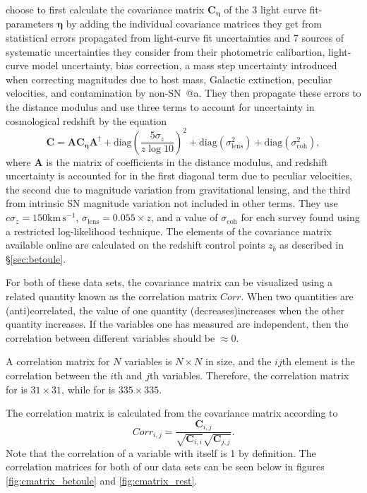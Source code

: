 \documentclass[12pt,a4paper]{article}
\makeatletter
\newcommand*{\rom}[1]{\expandafter\@slowromancap\romannumeral #1@}
\newcommand{\sn}{\mbox{SN}}
\newcommand{\sna}{\mbox{SN \rom{1}a}}
\makeatother
\begin{document}
\citet{betoule2014} choose to first calculate the covariance 
matrix $\mathbf{C}_{\mathbf{\eta}}$ of the 3 light curve fit-parameters $\mathbf{\eta}$ 
by adding the individual covariance matrices they get from statistical errors propagated 
from light-curve fit uncertainties and 7 sources of systematic uncertainties 
they consider from their photometric calibartion, light-curve model uncertainty, 
bias correction, a mass step uncertainty introduced when correcting magnitudes due 
to host mass, Galactic extinction, peculiar velocities, and contamination by 
non-\sna{}. They then propagate these errors to the distance modulus and use three 
terms to account for uncertainty in cosmological redshift by the equation
\begin{equation}
\label{eq:BetouleCovMatrix}
\mathbf{C} = \mathbf{A} \mathbf{C}_\mathbf{\eta} \mathbf{A}^\dag + \mathrm{diag}\left(\frac{5 \sigma_z}{z \log 10}\right)^2 + \mathrm{diag}\left(\sigma_{\mathrm{lens}}^2\right) + \mathrm{diag}\left(\sigma_{\mathrm{coh}}^2\right),
\end{equation}
where $\mathbf{A}$ is the matrix of coefficients in the distance modulus, 
and redshift uncertainty is accounted for in the first diagonal term due to 
peculiar velocities, the second due to magnitude variation from gravitational lensing, 
and the third from intrinsic \sn{} magnitude variation not included in other terms. 
They use $c \sigma_z = 150 \mathrm{km}\, \mathrm{s}^{-1}$, 
$\sigma_{\mathrm{lens}} = 0.055 \times z$, and a value of $\sigma_{\mathrm{coh}}$ for each 
survey found using a restricted log-likelihood technique. The elements of the covariance 
matrix available online are calculated on the redshift control points $z_b$ as 
described in \S \ref{sec:betoule}.

For both of these data sets, the covariance matrix can be visualized using a related
quantity known as the correlation matrix $Corr$. When two quantities are (anti)correlated,
the value of one quantity (decreases)increases when the other quantity increases.
If the variables one has measured are independent, then the correlation between
different variables should be $\approx0$.

A correlation matrix for $N$ variables is $N\times N$ in size, and the $ij$th
element is the correlation between the $i$th and $j$th variables. Therefore, 
the correlation matrix for \citet{betoule2014} is $31\times31$, while
for \citet{rest2014} is $335\times335$.

The correlation matrix is calculated from the covariance matrix according to
\begin{equation}
  \label{eq:correlation}
  Corr_{i,j} = \frac{\mathbf{C}_{i,j}}{\sqrt{\mathbf{C}_{i,i}}\sqrt{\mathbf{C}_{j,j}}}.
\end{equation}
Note that the correlation of a variable with itself is 1 by definition.
The correlation matrices for both of our data sets can be seen below in
figures \autoref{fig:cmatrix_betoule} and \autoref{fig:cmatrix_rest}.
\end{document}
